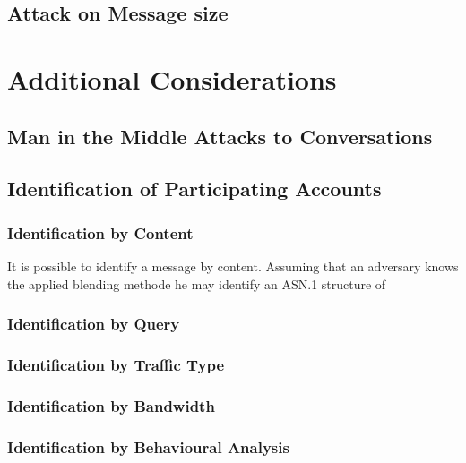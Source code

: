 \section{Attack on Message size}


\chapter{Additional Considerations}
\section{Man in the Middle Attacks to Conversations}


\section{Identification of Participating Accounts}


\subsection{Identification by Content}
It is possible to identify a message by content. Assuming that an adversary knows the applied blending methode he may identify an ASN.1 structure of 


\subsection{Identification by Query}


\subsection{Identification by Traffic Type}


\subsection{Identification by Bandwidth}


\subsection{Identification by Behavioural Analysis}

